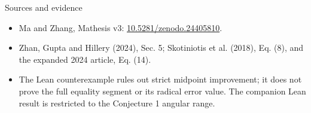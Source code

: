 \documentclass{beamer}
\begin{document}
\begin{frame}{Sources and evidence}
  \begin{itemize}
   \item Ma and Zhang, Mathesis v3: \href{https://doi.org/10.5281/zenodo.24405810}{10.5281/zenodo.24405810}.
   \item Zhan, Gupta and Hillery (2024), Sec. 5; Skotiniotis et al. (2018), Eq. (8), and the expanded 2024 article, Eq. (14).
   \item The Lean counterexample rules out strict midpoint improvement; it does not prove the full equality segment or its radical error value. The companion Lean result is restricted to the Conjecture 1 angular range.
  \end{itemize}
\end{frame}

\appendix
\FormalVerification
\end{document}
